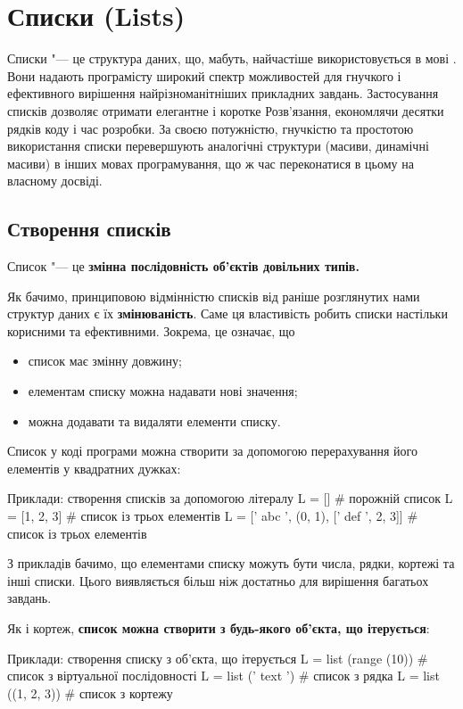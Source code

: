 \chapter{Списки (Lists)}\label{lst}

Списки "--- це структура даних, що, мабуть, найчастіше використовується в мові \Python. Вони надають програмісту широкий спектр можливостей для гнучкого і ефективного вирішення найрізноманітніших прикладних завдань. Застосування списків дозволяє отримати елегантне і коротке Розв'язання, економлячи десятки рядків коду і час розробки. За своєю потужністю, гнучкістю та простотою використання списки перевершують аналогічні структури (масиви, динамічні масиви) в інших мовах програмування, що ж час переконатися в цьому на власному досвіді.

\section{Створення списків}

\begin{defn}{Список "--- це}
\textbf{змінна послідовність об'єктів довільних типів.}
\end{defn}
\noindent Як бачимо, принциповою відмінністю списків від раніше розглянутих нами структур даних є їх \textbf{змінюваність}. Саме ця властивість робить списки настільки корисними та ефективними. Зокрема, це означає, що
\begin{itemize}
\item список має змінну довжину;
\item елементам списку можна надавати нові значення;
\item можна додавати та видаляти елементи списку.
\end{itemize}

Список у коді програми можна створити за допомогою перерахування його елементів у квадратних дужках:
\begin{py}{Приклади: створення списків за допомогою літералу}
L = [] # порожній список
L = [1, 2, 3] # список із трьох елементів
L = [' abc ', (0, 1), [' def ', 2, 3]] # список із трьох елементів
\end{py}
\noindent З прикладів бачимо, що елементами списку можуть бути числа, рядки, кортежі та інші списки. Цього виявляється більш ніж достатньо для вирішення багатьох завдань.

Як і кортеж, \textbf{список можна створити з будь-якого об'єкта, що ітерується}:
\begin{py}{Приклади: створення списку з об'єкта, що ітерується}
L = list (range (10)) # список з віртуальної послідовності
L = list (' text ') # список з рядка
L = list ((1, 2, 3)) # список з кортежу
\end{py}


